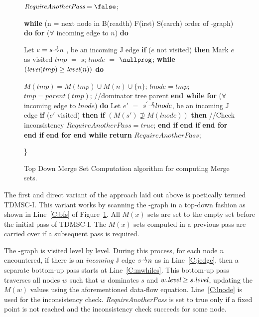 {\begin{figure}[!ht]
\begin{minipage}[t]{5in}
\begin{code}
 $\textit{RequireAnotherPass}=\false$;

 {\bf while} (n = next node in B(readth) F(irst) S(earch) order of \DJ-graph) {\bf do} \label{C:bfs}
      {\bf for} ($\forall$ incoming edge to $n$) {\bf do} \label{C:jedge}

          Let $e = s \st{J} n$ , be an incoming J edge
          {\bf if} ($e$ not visited) {\bf then}
              Mark $e$ as visited 
              $\textit{tmp}$ $=$ $s$;
              $\textit{lnode}$ $=$ $\nullprog$;
              {\bf while} $(\textit{level}(tmp)\ge \textit{level}(n))$ {\bf do} \label{C:mwhiles}

                   $M(tmp)=M(tmp)\cup M(n)\cup \{n\}$;
                   $lnode=tmp$;
                   $tmp=parent(tmp)$; //dominator tree parent
              {\bf end while} \label{C:mwhilee}
              {\bf for} ($\forall$ incoming edge to $lnode$) {\bf do} \label{C:lnode}
                  Let $e'$ $=$ $s^{'} \st{J} lnode$, be an incoming J edge
                  {\bf if} ($e'$ visited) {\bf then}
                     {\bf if} $(M(s') \not\supseteq M(lnode))$ {\bf then} //Check inconsistency
                         $RequireAnotherPass = true$;
                     {\bf end if}
                  {\bf end if}
              {\bf end for}
          {\bf end if}
     {\bf end for}
 {\bf end while}
 {\bf return} $RequireAnotherPass$;
\end{code}
\}
\end{minipage}
\caption{Top Down Merge Set Computation algorithm for computing Merge sets.}
\label{F:tdmsc}
\end{figure} 

The first and direct variant of the approach laid out above is poetically 
termed TDMSC-I. This variant works by scanning the \DJ-graph in a top-down 
fashion as shown in Line~\ref{C:bfs} of Figure~\ref{F:tdmsc}. All $M(x)$ sets 
are set to the empty set before the initial pass of TDMSC-I. The $M(x)$ sets 
computed in a previous pass are carried over if a subsequent pass is required. 

The \DJ-graph is visited
level by level. During this process, for each node $n$ encountered, if there is 
an \emph{incoming}
J edge $s \st{J} n$ as in Line~\ref{C:jedge}, then a separate bottom-up pass starts at 
Line~\ref{C:mwhiles}. This bottom-up pass traverses all nodes $w$ such that $w$ 
dominates $s$ and $w.\textit{level} \geq s.\textit{level}$,
updating the $M(w)$ values using the aforementioned data-flow equation. Line~\ref{C:lnode} is used for
the inconsistency check. \textit{RequireAnotherPass} is set to true only if a fixed point is not reached
and the inconsistency check succeeds for some node.

}
